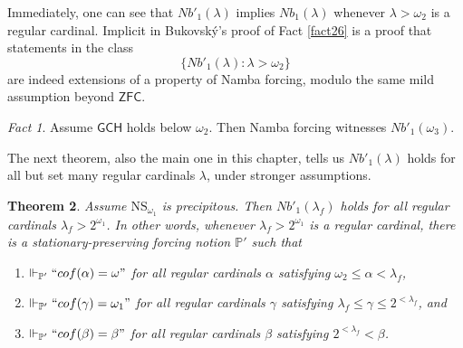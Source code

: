 \documentclass[12pt, twoside]{memoir}
\numberwithin{equation}{section}
\newtheorem{thm}{Theorem}[section]
\theoremstyle{definition}
\theoremstyle{remark}
\newtheorem{fact}[thm]{Fact}
\theoremstyle{definition}
\theoremstyle{definition}
\theoremstyle{definition}
\theoremstyle{remark}
\begin{document}
Immediately, one can see that $Nb'_1(\lambda)$ implies $Nb_1(\lambda)$ whenever $\lambda > \omega_2$ is a regular cardinal. Implicit in Bukovsk\'{y}'s proof of Fact \ref{fact26} is a proof that statements in the class
\begin{equation*}
    \{Nb'_1(\lambda) : \lambda > \omega_2\}
\end{equation*}
are indeed extensions of a property of Namba forcing, modulo the same mild assumption beyond $\mathsf{ZFC}$.

\begin{fact}
Assume $\mathsf{GCH}$ holds below $\omega_2$. Then Namba forcing witnesses $Nb'_1(\omega_3)$.
\end{fact}

The next theorem, also the main one in this chapter, tells us $Nb'_1(\lambda)$ holds for all but set many regular cardinals $\lambda$, under stronger assumptions.

\begin{thm}\label{notion1}
Assume $\mathrm{NS}_{\omega_1}$ is precipitous. Then $Nb'_1(\lambda_f)$ holds for all regular cardinals $\lambda_f > 2^{\omega_1}$. In other words, whenever $\lambda_f > 2^{\omega_1}$ is a regular cardinal, there is a stationary-preserving forcing notion $\mathbb{P}'$ such that 
\begin{enumerate}[label=(\arabic*)]
    \item\label{cond1} $\Vdash_{\mathbb{P}'} ``cof(\alpha) = \omega"$ for all regular cardinals $\alpha$ satisfying $\omega_2 \leq \alpha < \lambda_f$,
    \item\label{cond2} $\Vdash_{\mathbb{P}'} ``cof(\gamma) = \omega_1"$ for all regular cardinals $\gamma$ satisfying $\lambda_f \leq \gamma \leq 2^{< \lambda_f}$, and
    \item\label{cond3} $\Vdash_{\mathbb{P}'} ``cof(\beta) = \beta"$ for all regular cardinals $\beta$ satisfying $2^{< \lambda_f} < \beta$.
\end{enumerate}
\end{thm}
\end{document}
